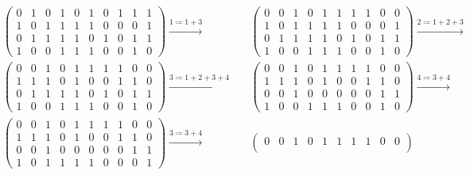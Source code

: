 \documentclass{article}
\begin{document}
\begin{align*}
    &\begin{pmatrix}
        0 & 1 & 0 & 1 & 0 & 1 & 0 & 1 & 1 & 1 \\
        1 & 0 & 1 & 1 & 1 & 1 & 0 & 0 & 0 & 1 \\
        0 & 1 & 1 & 1 & 1 & 0 & 1 & 0 & 1 & 1 \\
        1 & 0 & 0 & 1 & 1 & 1 & 0 & 0 & 1 & 0
    \end{pmatrix}
    \xrightarrow{1\coloneqq1+3}
    &&\begin{pmatrix}
        0 & 0 & 1 & 0 & 1 & 1 & 1 & 1 & 0 & 0 \\
        1 & 0 & 1 & 1 & 1 & 1 & 0 & 0 & 0 & 1 \\
        0 & 1 & 1 & 1 & 1 & 0 & 1 & 0 & 1 & 1 \\
        1 & 0 & 0 & 1 & 1 & 1 & 0 & 0 & 1 & 0
    \end{pmatrix}
    \xrightarrow{2\coloneqq1+2+3}\\
    &\begin{pmatrix}
        0 & 0 & 1 & 0 & 1 & 1 & 1 & 1 & 0 & 0 \\
        1 & 1 & 1 & 0 & 1 & 0 & 0 & 1 & 1 & 0 \\
        0 & 1 & 1 & 1 & 1 & 0 & 1 & 0 & 1 & 1 \\
        1 & 0 & 0 & 1 & 1 & 1 & 0 & 0 & 1 & 0
    \end{pmatrix}
    \xrightarrow{3\coloneqq1+2+3+4}
    &&\begin{pmatrix}
        0 & 0 & 1 & 0 & 1 & 1 & 1 & 1 & 0 & 0 \\
        1 & 1 & 1 & 0 & 1 & 0 & 0 & 1 & 1 & 0 \\
        0 & 0 & 1 & 0 & 0 & 0 & 0 & 0 & 1 & 1 \\
        1 & 0 & 0 & 1 & 1 & 1 & 0 & 0 & 1 & 0
    \end{pmatrix}
    \xrightarrow{4\coloneqq3+4}\\
    &\begin{pmatrix}
        0 & 0 & 1 & 0 & 1 & 1 & 1 & 1 & 0 & 0 \\
        1 & 1 & 1 & 0 & 1 & 0 & 0 & 1 & 1 & 0 \\
        0 & 0 & 1 & 0 & 0 & 0 & 0 & 0 & 1 & 1 \\
        1 & 0 & 1 & 1 & 1 & 1 & 0 & 0 & 0 & 1
    \end{pmatrix}
    \xrightarrow{3\coloneqq3+4}
    &&\begin{pmatrix}
        0 & 0 & 1 & 0 & 1 & 1 & 1 & 1 & 0 & 0 \\

\end{pmatrix}
\end{align*}
\end{document}
